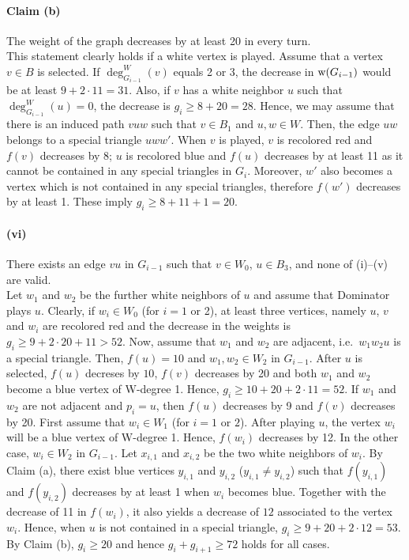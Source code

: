 \documentclass[12pt]{article}
\newcommand{\w}{{\rm w}}
\begin{document}
\paragraph{Claim (b)} The weight of the graph decreases by at least 20 in every turn.\\
This statement clearly holds if a white vertex is played. Assume that a vertex $v \in B$ is selected. If $\deg_{G_{i-1}}^W(v)$ equals 2 or 3, the decrease in $\w(G_{i-1})$ would be at least $9+2\cdot 11=31$.  Also, if $v$ has a white neighbor $u$ such that  $\deg_{G_{i-1}}^W(u)=0$, the decrease is $g_i \ge 8+20=28$. Hence, we may assume that there is an induced path $vuw$ such that $v\in B_1$ and $u, w \in W$. Then, the edge $uw$ belongs to a special triangle $uww'$. When $v$ is played, $v$ is recolored red and $f(v)$ decreases by 8; $u$ is recolored blue and $f(u)$ decreases by at least 11 as it cannot be contained in any special triangles in $G_{i}$. Moreover, $w'$ also becomes a  vertex which is not contained in any special triangles, therefore $f(w')$ decreases by at least  1. These imply $g_i \ge 8+11+1=20$.


\paragraph{(vi)} There exists an edge $vu$ in $G_{i-1}$ such that  $v \in W_0$, $u\in B_3$, and none of (i)--(v) are valid.\\
Let $w_1$ and $w_2$ be the further white neighbors of $u$ and assume that Dominator plays $u$. Clearly, if $w_i \in W_0$ (for $i=1$ or 2), at least three vertices, namely $u$, $v$ and $w_i$ are recolored red and the decrease in the weights is $g_i \ge 9+2\cdot 20 +11 >52$. Now, assume that $w_1$ and $w_2$ are adjacent, i.e.\ $w_1w_2u$ is a special triangle. Then, $f(u)=10$ and $w_1, w_2 \in  W_2$ in $G_{i-1}$. After $u$ is selected, $f(u)$ decreses by $10$, $f(v)$ decreases by 20 and both $w_1$ and $w_2$ become a blue vertex of W-degree 1. Hence, $g_i \ge 10+20+2\cdot 11 =52$.
If $w_1$ and $w_2$ are not adjacent and $p_i=u$, then $f(u)$ decreases by 9 and $f(v)$ decreases by 20. First assume that $w_i \in W_1$ (for $i=1$ or $2$). After playing $u$, the vertex $w_i$ will be a blue vertex of W-degree 1. Hence, $f(w_i)$ decreases by 12. In the other case, $w_i \in W_2$ in $G_{i-1}$. Let $x_{i,1}$ and $x_{i,2}$ be the two white neighbors of $w_i$. By Claim (a), there exist blue vertices $y_{i,1}$ and $y_{i,2}$ ($y_{i,1}\neq y_{i,2}$) such that $f(y_{i,1})$ and $f(y_{i,2})$ decreases by at least 1 when $w_i$ becomes blue. Together with the decrease of 11 in $f(w_i)$, it also yields a decrease of $12$ associated to the vertex $w_i$. Hence, when $u$ is not contained in a special triangle,  $g_i \ge 9+20+2\cdot 12=53$. By Claim (b), $g_i \ge 20$ and hence $g_i+g_{i+1}\ge 72$ holds for all cases.
\end{document}
